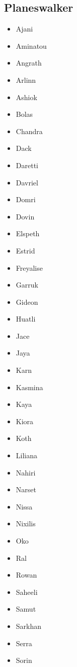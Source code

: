 \documentclass{article}
\begin{document}
\subsection{Planeswalker}
\begin{multicols}{3}
    \begin{itemize}
        \item Ajani
        \item Aminatou
        \item Angrath
        \item Arlinn
        \item Ashiok
        \item Bolas
        \item Chandra
        \item Dack
        \item Daretti
        \item Davriel
        \item Domri
        \item Dovin
        \item Elspeth
        \item Estrid
        \item Freyalise
        \item Garruk
        \item Gideon
        \item Huatli
        \item Jace
        \item Jaya
        \item Karn
        \item Kasmina
        \item Kaya
        \item Kiora
        \item Koth
        \item Liliana
        \item Nahiri
        \item Narset
        \item Nissa
        \item Nixilis
        \item Oko
        \item Ral
        \item Rowan
        \item Saheeli
        \item Samut
        \item Sarkhan
        \item Serra
        \item Sorin

\end{itemize}
\end{multicols}
\end{document}

